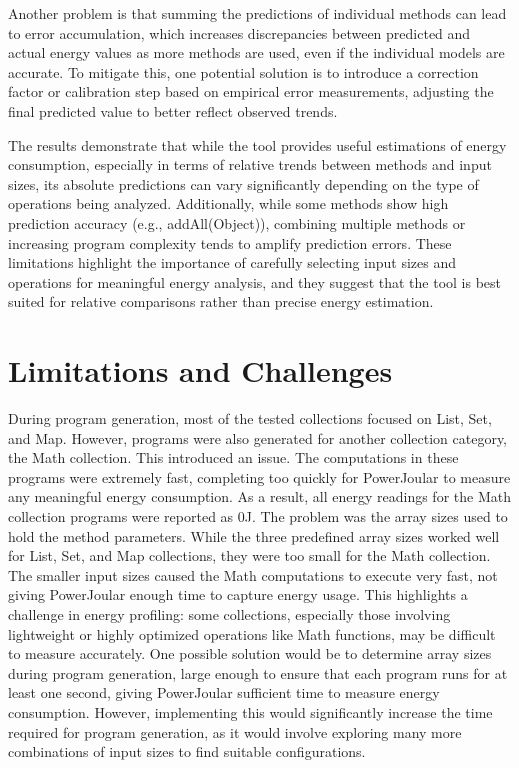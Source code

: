 Another problem is that summing the predictions of individual methods can lead to error accumulation, which increases discrepancies between predicted and actual energy values as more methods are used, even if the individual models are accurate. To mitigate this, one potential solution is to introduce a correction factor or calibration step based on empirical error measurements, adjusting the final predicted value to better reflect observed trends.

The results demonstrate that while the tool provides useful estimations of energy consumption, especially in terms of relative trends between methods and input sizes, its absolute predictions can vary significantly depending on the type of operations being analyzed. Additionally, while some methods show high prediction accuracy (e.g., addAll(Object)), combining multiple methods or increasing program complexity tends to amplify prediction errors. These limitations highlight the importance of carefully selecting input sizes and operations for meaningful energy analysis, and they suggest that the tool is best suited for relative comparisons rather than precise energy estimation.




\section{Limitations and Challenges} \label{sec:limitations_and_challenges}

During program generation, most of the tested collections focused on List, Set, and Map. However, programs were also generated for another collection category, the Math collection. This introduced an issue. The computations in these programs were extremely fast, completing too quickly for PowerJoular to measure any meaningful energy consumption. As a result, all energy readings for the Math collection programs were reported as 0J.
The problem was the array sizes used to hold the method parameters. While the three predefined array sizes worked well for List, Set, and Map collections, they were too small for the Math collection. The smaller input sizes caused the Math computations to execute very fast, not giving PowerJoular enough time to capture energy usage.
This highlights a challenge in energy profiling: some collections, especially those involving lightweight or highly optimized operations like Math functions, may be difficult to measure accurately. One possible solution would be to determine array sizes during program generation, large enough to ensure that each program runs for at least one second, giving PowerJoular sufficient time to measure energy consumption. However, implementing this would significantly increase the time required for program generation, as it would involve exploring many more combinations of input sizes to find suitable configurations.


